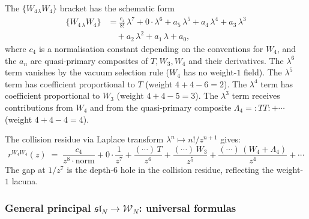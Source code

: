 \begin{computation}
\label{comp:w4-w4-collision}
%
The $\{W_4{}_\lambda W_4\}$ bracket has the schematic form
\begin{align*}
\{W_{4\,\lambda} W_4\}
&= \frac{c_4}{8!}\,\lambda^7
 + 0 \cdot \lambda^6
 + a_5\,\lambda^5
 + a_4\,\lambda^4
 + a_3\,\lambda^3 \\
&\quad + a_2\,\lambda^2
 + a_1\,\lambda
 + a_0,
\end{align*}
where $c_4$ is a normalisation constant depending on the
conventions for $W_4$, and the $a_n$ are quasi-primary
composites of $T, W_3, W_4$ and their derivatives.
The $\lambda^6$ term vanishes by the vacuum selection
rule ($W_4$ has no weight-$1$ field). The $\lambda^5$ term
has coefficient proportional to $T$ (weight $4 + 4 - 6 = 2$).
The $\lambda^4$ term has coefficient proportional to $W_3$
(weight $4 + 4 - 5 = 3$). The $\lambda^3$ term receives
contributions from $W_4$ and from the quasi-primary composite
$\Lambda_4 = {:}TT{:} + \cdots$ (weight $4 + 4 - 4 = 4$).

The collision residue via Laplace transform
$\lambda^n \mapsto n!/z^{n+1}$ gives:
\[
r^{W_4 W_4}(z)
\;=\;
\frac{c_4}{z^8 \cdot \text{norm}}
+ 0 \cdot \frac{1}{z^7}
+ \frac{(\cdots)\,T}{z^6}
+ \frac{(\cdots)\,W_3}{z^5}
+ \frac{(\cdots)\,(W_4 + \Lambda_4)}{z^4}
+ \cdots
\]
The gap at $1/z^7$ is the depth-$6$ hole in the collision
residue, reflecting the weight-$1$ lacuna.
\end{computation}

\subsubsection{General principal $\mathfrak{sl}_N \to
\mathcal{W}_N$: universal formulas}
\label{subsubsec:ds-slN-wN-universal}

